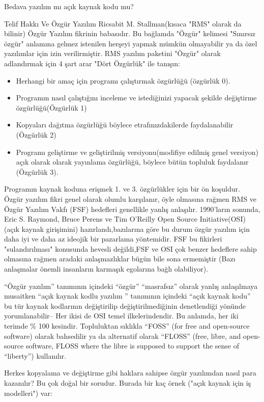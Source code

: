 \begin{section}{Bedava yazılım mı açık kaynak kodu mu?}
\begin{subsection}{Telif Hakkı Ve Özgür Yazılım}
Ricsabit M. Stallman(kısaca "RMS" olarak da bilinir) Özgür Yazılım fikrinin babasıdır. Bu bağlamda "Özgür" kelimesi "Sınırsız özgür" anlamına gelmez istenilen herşeyi yapmak mümkün olmayabilir ya da özel yazılımlar için izin verilirmiştir. RMS yazılım paketini "Özgür" olarak adlandırmak için 4 şart arar "Dört Özgürlük" ile tanışın:

\begin{itemize}
 \item Herhangi bir amaç için programı çalıştırmak  özgürlüğü (özgürlük 0).
 \item Programın nasıl çalıştığını inceleme ve istediğinizi yapacak şekilde değiştirme özgürlüğü(Özgürlük 1)
 \item Kopyaları dağıtma özgürlüğü böylece etrafınızdakilerde faydalanabilir (Özgürlük 2)
 \item Programı geliştirme ve geliştirilmiş versiyonu(modifiye edilmiş genel versiyon) açık olarak olarak yayınlama özgürlüğü, böylece bütün topluluk
faydalanır (Özgürlük 3).
 \end{itemize}

Programın kaynak koduna erişmek 1. ve 3. özgürlükler için bir ön koşuldur. Özgür yazılım fikri genel olarak olumlu karşılanır, öyle olmasına rağmen RMS ve Özgür Yazılım Vakfı (FSF) hedefleri genellikle yanlış anlaşılır. 1990'ların sonunda, Eric S. Raymond, Bruce Perens ve Tim O'Reilly Open Source Initiative(OSI)(açık kaynak girişimini) hazırlandı,bazılarına göre bu durum özgür yazılım için daha iyi ve daha az ideojik bir pazarlama yöntemidir. FSF bu fikirleri "sulandırılması" konusunda hevesli değildi,FSF ve OSI çok benzer hedeflere sahip olmasına rağmen aradaki anlaşmazlıklar bügün bile sona ermemiştir (Bazı anlaşmalar önemli insanların karmaşık egolarına bağlı olabiliyor).

“Özgür yazılım” tanımının içindeki “özgür” “masrafsız” olarak yanlış anlaşılmaya musaitken “açık kaynak kodlu yazılım ” tanımının içindeki “açık kaynak kodu” bu tür kaynak kodlarının değiştirilip değiştirilmediğinin denetlendiği yönünde yorumlanabilir-- Her ikisi de OSI temel ilkelerindendir. Bu anlamda, her iki terimde \% 100 kesindir. Topluluktan sıklıkla “FOSS” (for free and open-source software) olarak bahsedilir ya da alternatif olarak “FLOSS” (free, libre, and open-source software, FLOSS where the libre is supposed to support the sense of “liberty”) kullanılır.

Herkes kopyalama ve değiştirme gibi haklara sahipse özgür yazılımdan nasıl para kazanılır? Bu çok doğal bir sorudur. Burada bir kaç örnek ("açık kaynak için iş modelleri") var:


\end{subsection}
\end{section}
